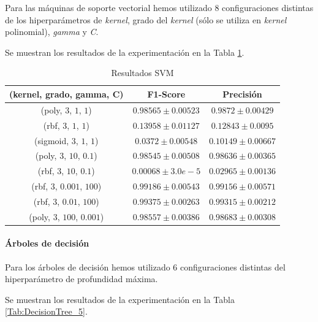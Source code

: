 \documentclass[12pt]{article}
\begin{document}
Para las máquinas de soporte vectorial hemos utilizado 8 configuraciones distintas de los hiperparámetros de \textit{kernel},
grado del \textit{kernel} (sólo se utiliza en \textit{kernel} polinomial), \textit{gamma} y \textit{C}.

Se muestran los resultados de la experimentación en la Tabla \ref{Tab:SVM_5}.

\newpage
\begin{table}[!ht]
	\caption{Resultados SVM}
	\centering
		 \begin{tabular}{||c c c||}
			\hline 
			(kernel, grado, gamma, C) & F1-Score & Precisión \\ [0.5ex]  
			\hline\hline
			(poly, $3$, $1$, $1$) & $0.98565 \pm 0.00523$ & $0.9872 \pm 0.00429$ \\
			\hline 
			(rbf, $3$, $1$, $1$) & $0.13958 \pm 0.01127$ & $0.12843 \pm 0.0095$ \\
			\hline 
			(sigmoid, $3$, $1$, $1$) & $0.0372 \pm 0.00548$ & $0.10149 \pm 0.00667$ \\
			\hline 
			(poly, $3$, $10$, $0.1$) & $0.98545 \pm 0.00508$ & $0.98636 \pm 0.00365$ \\
			\hline 
			(rbf, $3$, $10$, $0.1$) & $0.00068 \pm 3.0e-5$ & $0.02965 \pm 0.00136$ \\
			\hline 
			(rbf, $3$, $0.001$, $100$) & $0.99186 \pm 0.00543$ & $0.99156 \pm 0.00571$ \\
			\hline 
			(rbf, $3$, $0.01$, $100$) & $0.99375 \pm 0.00263$ & $0.99315 \pm 0.00212$ \\
			\hline 
			(poly, $3$, $100$, $0.001$) & $0.98557 \pm 0.00386$ & $0.98683 \pm 0.00308$ \\
			\hline 
		 \end{tabular}
	\label{Tab:SVM_5}
	\end{table}

\paragraph{Árboles de decisión}
Para los árboles de decisión hemos utilizado 6 configuraciones distintas del hiperparámetro de profundidad máxima.

Se muestran los resultados de la experimentación en la Tabla \ref{Tab:DecisionTree_5}.
\end{document}
